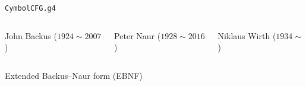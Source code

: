 
\begin{frame}{}

  \begin{center}
    \texttt{CymbolCFG.g4}
  \end{center}
\end{frame}

\begin{frame}{}
  \begin{center}
  \end{center}

  \begin{columns}
      \begin{center}
        John Backus ($1924 \sim 2007$)
      \end{center}
      \begin{center}
        Peter Naur ($1928 \sim 2016$)
      \end{center}
      \pause
      \begin{center}
        Niklaus Wirth ($1934 \sim$)
      \end{center}
  \end{columns}

  \pause
  \begin{center}
  \end{center}
\end{frame}

\begin{frame}{}
  \begin{center}
    Extended Backus–Naur form (EBNF)
  \end{center}

  \vspace{0.50cm}
  \begin{columns}
  \end{columns}
  \begin{center}
  \end{center}
\end{frame}

